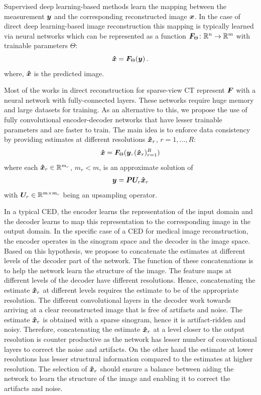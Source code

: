 Supervised deep learning-based methods learn the mapping between the measurement $\bm{y}$ and the corresponding reconstructed image $\bm{x}$. In the case of direct deep learning-based image reconstruction this mapping is typically learned via neural networks which can be represented as a function $\bm{F}_{\Theta}\colon \mathbb{R}^n \to \mathbb{R}^m$ with trainable parameters $\Theta$: 
\begin{equation}\label{eq:dl}
\bm{\hat{x}} = \bm{F}_{\Theta}(\bm{y}) \, .
\end{equation}  
where, $\bm{\hat{x}}$ is the predicted image. 

Most of the works in direct reconstruction for sparse-view \ac{CT} represent $\bm{F}$ with a neural network with fully-connected layers. These networks require huge memory and large datasets for training. As an alternative to this, we propose the use of fully convolutional encoder-decoder networks that have lesser trainable parameters and are faster to train. 
The main idea is to enforce data consistency by providing estimates at different resolutions $\bm{\hat{x}}_r$, $r = 1, \ldots, R$:
\begin{equation}\label{eq:d}
\bm{\hat{x}} = \bm{F}_{\Theta}(\bm{y},   (\bm{\hat{x}}_r)_{r=1}^R    ) 
\end{equation}  
where each $\bm{\hat{x}}_r \in \mathbb{R}^{m_r}$, $m_r < m$, is an approximate solution of
\begin{equation}\label{eq:xr}
\bm{y} = \bm{P} \bm{U}_r \bm{\hat{x}}_r
\end{equation} 
with $\bm{U}_r\in\mathbb{R}^{m\times m_r}$ being an upsampling operator.

In a typical \ac{CED}, the encoder learns the representation of the input domain and the decoder learns to map this representation to the corresponding image in the output domain. In the specific case of a \ac{CED} for medical image reconstruction, the encoder operates in the sinogram space and the decoder in the image space. Based on this hypothesis, we propose to concatenate the estimates at different levels of the decoder part of the network. The function of these concatenations is to help the network learn the structure of the image. The feature maps at different levels of the decoder have different resolutions. Hence, concatenating the estimate $\bm{\hat{x}}_r$ at different levels requires the estimate to be of the appropriate resolution. The different convolutional layers in the decoder work towards arriving at a clear reconstructed image that is free of artifacts and noise. The estimate $\bm{\hat{x}}_r$ is obtained with a sparse sinogram, hence it is artifact-ridden and noisy. Therefore, concatenating the estimate $\bm{\hat{x}}_r$ at a level closer to the output resolution is counter productive as the network has lesser number of convolutional layers to correct the noise and artifacts. On the other hand the estimate at lower resolutions has lesser structural information compared to the estimates at higher resolution. The selection of $\bm{\hat{x}}_r$ should ensure a balance between aiding the network to learn the structure of the image and enabling it to correct the artifacts and noise. 

